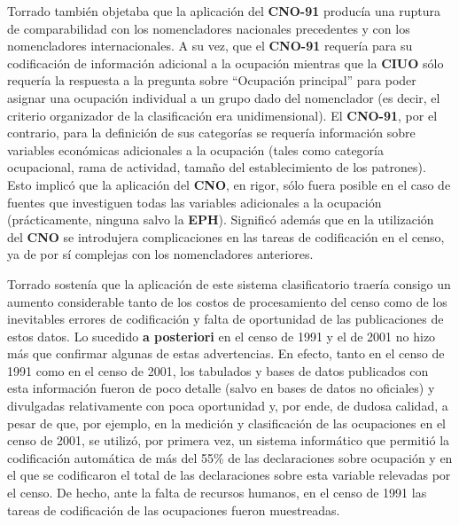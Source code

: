 \documentclass[
]{book}
\begin{document}
Torrado \citeyearpar{Torrado1993a} también objetaba que la aplicación del \textbf{CNO-91} producía una ruptura de comparabilidad con los nomencladores nacionales precedentes y con los nomencladores internacionales. A su vez, que el \textbf{CNO-91} requería para su codificación de información adicional a la ocupación mientras que la \textbf{CIUO} sólo requería la respuesta a la pregunta sobre ``Ocupación principal'' para poder asignar una ocupación individual a un grupo dado del nomenclador (es decir, el criterio organizador de la clasificación era unidimensional). El \textbf{CNO-91}, por el contrario, para la definición de sus categorías se requería información sobre variables económicas adicionales a la ocupación (tales como categoría ocupacional, rama de actividad, tamaño del establecimiento de los patrones). Esto implicó que la aplicación del \textbf{CNO}, en rigor, sólo fuera posible en el caso de fuentes que investiguen todas las variables adicionales a la ocupación (prácticamente, ninguna salvo la \textbf{EPH}). Significó además que en la utilización del \textbf{CNO} se introdujera complicaciones en las tareas de codificación en el censo, ya de por sí complejas con los nomencladores anteriores.

Torrado \citeyearpar{Torrado1993a} sostenía que la aplicación de este sistema clasificatorio traería consigo un aumento considerable tanto de los costos de procesamiento del censo como de los inevitables errores de codificación y falta de oportunidad de las publicaciones de estos datos. Lo sucedido \textbf{a posteriori} en el censo de 1991 y el de 2001 no hizo más que confirmar algunas de estas advertencias. En efecto, tanto en el censo de 1991 como en el censo de 2001, los tabulados y bases de datos publicados con esta información fueron de poco detalle (salvo en bases de datos no oficiales) y divulgadas relativamente con poca oportunidad y, por ende, de dudosa calidad, a pesar de que, por ejemplo, en la medición y clasificación de las ocupaciones en el censo de 2001, se utilizó, por primera vez, un sistema informático que permitió la codificación automática de más del 55\% de las declaraciones sobre ocupación y en el que se codificaron el total de las declaraciones sobre esta variable relevadas por el censo. De hecho, ante la falta de recursos humanos, en el censo de 1991 las tareas de codificación de las ocupaciones fueron muestreadas.
\end{document}
